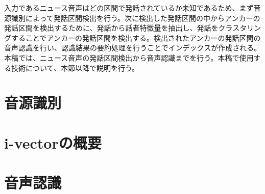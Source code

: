 入力であるニュース音声はどの区間で発話されているか未知であるため、まず音源識別によって発話区間検出を行う。次に検出した発話区間の中からアンカーの発話区間を検出するために、発話から話者特徴量を抽出し、発話をクラスタリングすることでアンカーの発話区間を検出する。検出されたアンカーの発話区間の音声認識を行い、認識結果の要約処理を行うことでインデックスが作成される。本稿では、ニュース音声の発話区間検出から音声認識までを行う。本稿で使用する技術について、本節以降で説明を行う。

\section{音源識別}
\label{section:devide_audio}


\section{i-vectorの概要}


\section{音声認識}

